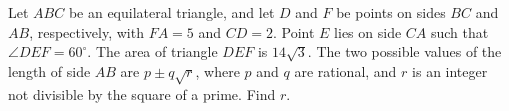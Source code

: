 Let $ABC$ be an equilateral triangle, and let $D$ and $F$ be points on sides $BC$ and $AB$, respectively, with $FA=5$ and $CD=2$.  Point $E$ lies on side $CA$ such that $\angle DEF = 60^\circ$.  The area of triangle $DEF$ is $14\sqrt{3}$.  The two possible values of the length of side $AB$ are $p \pm q\sqrt{r}$, where $p$ and $q$ are rational, and $r$ is an integer not divisible by the square of a prime.  Find $r$.